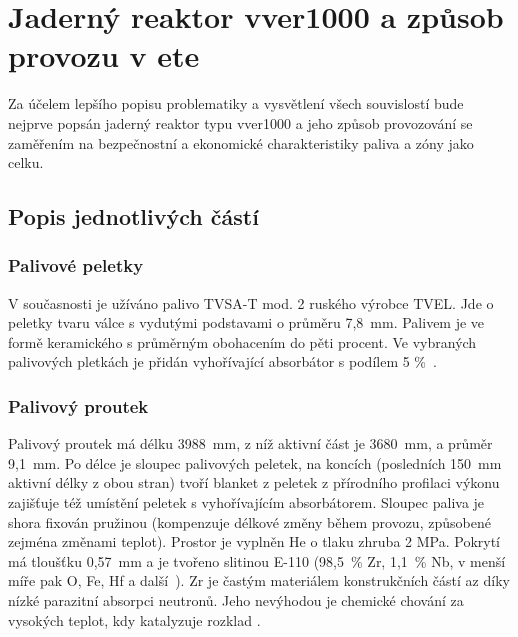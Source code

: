 \chapter{Jaderný reaktor \acs{vver1000} a způsob provozu v \acs{ete}}

Za účelem lepšího popisu problematiky a vysvětlení všech souvislostí bude nejprve popsán jaderný reaktor typu \ac{vver1000} a jeho 
způsob provozování se zaměřením na bezpečnostní a ekonomické charakteristiky paliva a zóny jako celku.

\section{Popis jednotlivých částí}

\subsection{Palivové peletky}
V současnosti je užíváno palivo TVSA-T mod. 2 ruského výrobce TVEL. Jde o peletky tvaru válce s vydutými podstavami o průměru 7,8~mm. 
Palivem je  ve formě keramického  s průměrným obohacením do pěti procent. Ve vybraných palivových 
pletkách je přidán vyhořívající absorbátor  s podílem 
5 \%~\cite{milisdorfer, klima}. 

\subsection{Palivový proutek}
Palivový proutek má délku 3988~mm, z níž aktivní část je 3680~mm, a průměr 9,1~mm. 
Po délce je sloupec palivových peletek, 
na koncích (posledních 150~mm aktivní délky z obou stran) tvoří blanket z peletek z přírodního  profilaci výkonu zajišťuje též 
umístění peletek s vyhořívajícím absorbátorem. Sloupec paliva je shora fixován pružinou (kompenzuje délkové změny během provozu, způsobené 
zejména změnami teplot). Prostor je vyplněn He o tlaku zhruba 2 MPa. Pokrytí má tloušťku 0,57~mm a 
je tvořeno slitinou E-110 (98,5~\% Zr, 1,1~\% Nb, v menší míře pak O, Fe, Hf a další~\cite{blokhin}). Zr je častým materiálem konstrukčních 
částí \ac{az} díky nízké parazitní absorpci neutronů. Jeho nevýhodou je chemické chování za vysokých teplot, kdy katalyzuje rozklad .

